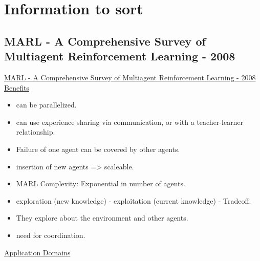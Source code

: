 
\chapter{Information to sort}
\label{ch:Info}

\section{MARL - A Comprehensive Survey of Multiagent Reinforcement Learning - 2008}
\href{https://ieeexplore.ieee.org/abstract/document/4445757}{MARL - A Comprehensive Survey of Multiagent Reinforcement Learning - 2008}
\\
\underline{Benefits}
\begin{itemize}[noitemsep,nolistsep]
	\item can be parallelized.
	\item can use experience sharing via communication, or with a teacher-learner relationship.
	\item Failure of one agent can be covered by other agents.
	\item insertion of new agents => scaleable.
	\item MARL Complexity: Exponential in number of agents.
	\item exploration (new knowledge) - exploitation (current knowledge) - Tradeoff.
	\item They explore about the environment and other agents.
	\item need for coordination.
\end{itemize}
\underline{Application Domains}
